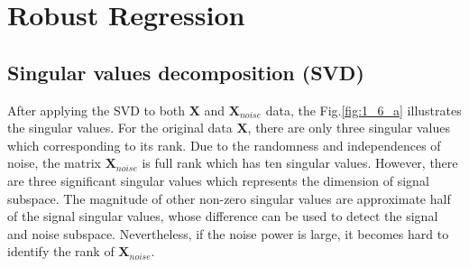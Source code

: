 \section{Robust Regression}
\subsection{Singular values decomposition (SVD)}
After applying the SVD to both $\mathbf X$ and $\mathbf X_{noise}$ data, the Fig.\ref{fig:1_6_a} illustrates the singular values. For the original data $\mathbf X$, there are only three singular values which corresponding to its rank. Due to the randomness and independences of noise, the matrix $\mathbf X_{noise}$ is full rank which has ten singular values. However, there are three significant singular values which represents the dimension of signal subspace. The magnitude of other non-zero singular values are approximate half of the signal singular values, whose difference can be used to detect the signal and noise subspace. Nevertheless, if the noise power is large, it becomes hard to identify the rank of $\mathbf X_{noise}$.
